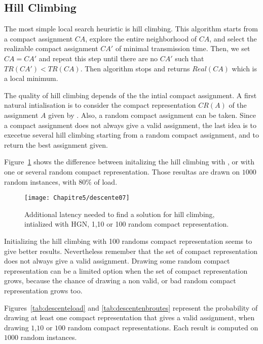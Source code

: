 \subsection{Hill Climbing}

The most simple local search heuristic is hill climbing. This algorithm starts from a compact assignment $CA$, explore the entire neighborhood of $CA$, and select the realizable compact assignment $CA'$ of minimal transmission time. Then, we set $CA = CA'$ and repeat this step until there are no $CA'$ such that $TR(CA') < TR(CA)$. Then algorithm stops and returns $Real(CA)$ which is a local minimum. 

The quality of hill climbing depends of the the intial compact assignment. A first natural intialisation is to consider the compact representation $CR(A)$ of the assignment $A$ given by \hybridgreedynormalized. Also, a random compact assignment can be taken. Since a compact assignment does not always give a valid assignment, the last idea is to execetue several hill climbing starting from a random compact assignment, and to return the best assignment given.

Figure~\ref{fig:descente07} shows the difference between initalizing the hill climbing with \hybridgreedynormalized, or with one or several random compact representation. Those resultas are drawn on $1000$ random instances, with $80\%$ of load.
\begin{figure}[h] 
	\centering
	\texttt{[image: Chapitre5/descente07]}
\caption{ Additional latency needed to find a solution for hill climbing, intialized with HGN, 1,10 or 100 random compact representation.}
\label{fig:descente07}
\end{figure}
Initializing the hill climbing with 100 randoms compact representation seems to give better results. Nevertheless remember that the set of compact representation does not always give a valid assignment. Drawing some random compact representation can be a limited option when the set of compact representation grows, because the chance of drawing a non valid, or bad random compact representation grows too.

Figures~\ref{tab:descenteload} and \ref{tab:descentenbroutes} represent the probability of drawing at least one compact representation that gives a valid assignment, when drawing $1$,$10$ or $100$ random compact representations. Each result is computed on $1000$ random instances.

